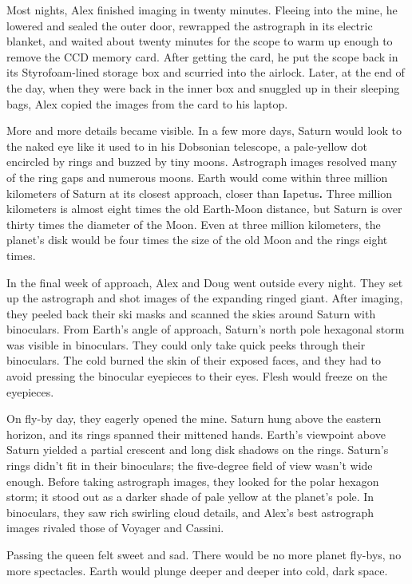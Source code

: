 Most nights, Alex finished imaging in twenty minutes. Fleeing into the
mine, he lowered and sealed the outer door, rewrapped the astrograph in
its electric blanket, and waited about twenty minutes for the scope to
warm up enough to remove the CCD memory card. After getting the card, he
put the scope back in its Styrofoam-lined storage box and scurried into
the airlock. Later, at the end of the day, when they were back in the
inner box and snuggled up in their sleeping bags, Alex copied the images
from the card to his laptop.

More and more details became visible. In a few more days, Saturn would
look to the naked eye like it used to in his Dobsonian telescope, a
pale-yellow dot encircled by rings and buzzed by tiny moons. Astrograph
images resolved many of the ring gaps and numerous moons. Earth would
come within three million kilometers of Saturn at its closest approach,
closer than Iapetus\textbf{.} Three million kilometers is almost eight
times the old Earth-Moon distance\emph{,} but Saturn is over thirty
times the diameter of the Moon. Even at three million kilometers, the
planet's disk would be four times the size of the old Moon and the rings
eight times.

In the final week of approach, Alex and Doug went outside every night.
They set up the astrograph and shot images of the expanding ringed
giant. After imaging, they peeled back their ski masks and scanned the
skies around Saturn with binoculars. From Earth's angle of approach,
Saturn's north pole hexagonal storm was visible in binoculars. They
could only take quick peeks through their binoculars. The cold burned
the skin of their exposed faces, and they had to avoid pressing the
binocular eyepieces to their eyes. Flesh would freeze on the eyepieces.

On fly-by day, they eagerly opened the mine. Saturn hung above the
eastern horizon, and its rings spanned their mittened hands. Earth's
viewpoint above Saturn yielded a partial crescent and long disk shadows
on the rings. Saturn's rings didn't fit in their binoculars; the
five-degree field of view wasn't wide enough. Before taking astrograph
images, they looked for the polar hexagon storm; it stood out as a
darker shade of pale yellow at the planet's pole. In binoculars, they
saw rich swirling cloud details, and Alex's best astrograph images
rivaled those of Voyager and Cassini.

Passing the queen felt sweet and sad. There would be no more planet
fly-bys, no more spectacles. Earth would plunge deeper and deeper into
cold, dark space.


%
 
